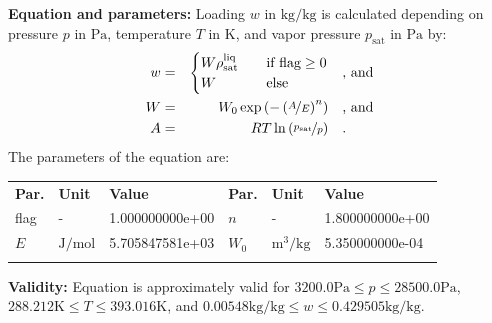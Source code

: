 \textbf{Equation and parameters:}
\newline
%
Loading $w$ in $\si{\kilogram\per\kilogram}$ is calculated depending on pressure $p$ in $\si{\pascal}$, temperature $T$ in $\si{\kelvin}$, and vapor pressure $p_\mathrm{sat}$ in $\si{\pascal}$ by:
%
\begin{equation*}
\begin{split}
w &=& \begin{cases} W \rho_\mathrm{sat}^{\mathrm{liq}} & \quad \text{if flag} \geq 0 \\ W & \quad \text{else} \end{cases} & \quad\text{, and} \\
W &=& W_0 \exp \left( - \left( \nicefrac{A}{E} \right) ^{n} \right) & \quad\text{, and} \\
A &=& R T \ln \left( \nicefrac{p_\mathrm{sat}}{p} \right) & \quad\text{.} \\
\end{split}
\end{equation*}
%
The parameters of the equation are:
%
\begin{longtable}[l]{lll|lll}
\toprule
\addlinespace
\textbf{Par.} & \textbf{Unit} & \textbf{Value} &	\textbf{Par.} & \textbf{Unit} & \textbf{Value} \\
\addlinespace
\midrule
\endhead

\bottomrule
\endfoot
\bottomrule
\endlastfoot
\addlinespace

flag & - & 1.000000000e+00 & $n$ & - & 1.800000000e+00 \\
$E$ & $\si{\joule\per\mole}$ & 5.705847581e+03 & $W_0$ & $\si{\cubic\meter\per\kilogram}$ & 5.350000000e-04 \\

\addlinespace\end{longtable}

\textbf{Validity:}
\newline
Equation is approximately valid for $3200.0 \si{\pascal} \leq p \leq 28500.0 \si{\pascal}$,  $288.212 \si{\kelvin} \leq T \leq 393.016 \si{\kelvin}$, and $0.00548 \si{\kilogram\per\kilogram} \leq w \leq 0.429505 \si{\kilogram\per\kilogram}$.
\newline

